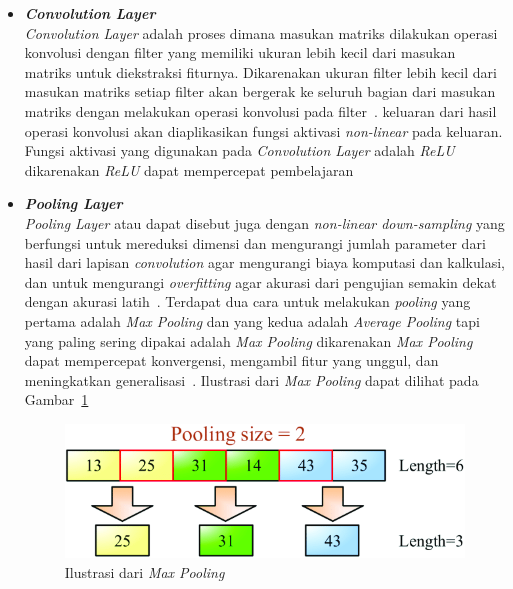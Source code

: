 \begin{itemize}
      \item \emph{\bfseries Convolution Layer}\\ 
      \emph{Convolution Layer} adalah proses dimana masukan matriks dilakukan operasi konvolusi dengan
      filter yang memiliki ukuran lebih kecil dari masukan matriks untuk diekstraksi fiturnya.
      Dikarenakan ukuran filter lebih kecil dari masukan matriks setiap filter akan bergerak ke
      seluruh bagian dari masukan matriks dengan melakukan operasi konvolusi pada filter~\citep{Abdurrahman2020}.
      keluaran dari hasil operasi konvolusi akan diaplikasikan fungsi aktivasi \emph{non-linear} pada keluaran. Fungsi aktivasi
      yang digunakan pada \emph{Convolution Layer} adalah \emph{ReLU} dikarenakan
      \emph{ReLU} dapat mempercepat pembelajaran~\citep{Li2021}

      \item \emph{\bfseries Pooling Layer}\\
      \emph{Pooling Layer} atau dapat disebut juga dengan \emph{non-linear down-sampling} yang berfungsi
      untuk mereduksi dimensi dan mengurangi jumlah parameter dari hasil dari lapisan \emph{convolution}
      agar mengurangi biaya komputasi dan kalkulasi, dan untuk mengurangi \emph{overfitting} agar
      akurasi dari pengujian semakin dekat dengan akurasi latih~\citep{Wu2019}. Terdapat dua cara
      untuk melakukan \emph{pooling} yang pertama adalah \emph{Max Pooling} dan yang kedua adalah
      \emph{Average Pooling} tapi yang paling sering dipakai adalah \emph{Max Pooling} dikarenakan
      \emph{Max Pooling} dapat mempercepat konvergensi, mengambil fitur yang unggul, dan meningkatkan
      generalisasi~\citep{Chen2020}. Ilustrasi dari \emph{Max Pooling} dapat dilihat pada
      Gambar~\ref{fig:1d_max_pooling}

      \begin{figure}[H]
            \centering
            \includegraphics[scale=0.5]{assets/1d_max_pooling.png}
            \caption{Ilustrasi dari \emph{Max Pooling}~\citep{Kuo2018}}
            \label{fig:1d_max_pooling}
      \end{figure}


\end{itemize}
